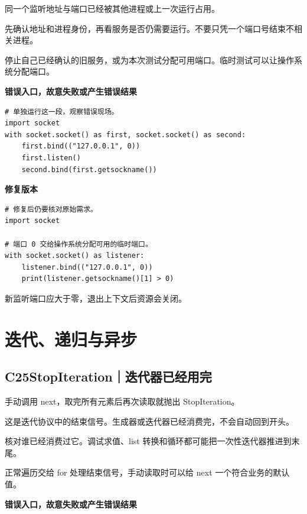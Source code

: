 \documentclass[UTF8,a4paper,oneside,openany,fontset=none,11pt]{ctexbook}
\newcommand{\code}[1]{\texttt{\detokenize{#1}}}
\newcommand{\CaseStep}[2]{\par\smallskip{\bfseries\color{Muted}#1}\enspace #2\par}
\begin{document}
\CaseStep{原因}{同一个监听地址与端口已经被其他进程或上一次运行占用。}

\CaseStep{排查}{先确认地址和进程身份，再看服务是否仍需要运行。不要只凭一个端口号结束不相关进程。}

\CaseStep{修复}{停止自己已经确认的旧服务，或为本次测试分配可用端口。临时测试可以让操作系统分配端口。}

\textbf{错误入口，故意失败或产生错误结果}

\begin{lstlisting}[style=errorcode,title={错误复现（故意失败或错误结果）：\code{case_24_bad.py.txt}}]
# 单独运行这一段，观察错误现场。
import socket
with socket.socket() as first, socket.socket() as second:
    first.bind(("127.0.0.1", 0))
    first.listen()
    second.bind(first.getsockname())
\end{lstlisting}

\textbf{修复版本}

\begin{lstlisting}[title={\code{case_24.py}}]
# 修复后仍要核对原始需求。
import socket

# 端口 0 交给操作系统分配可用的临时端口。
with socket.socket() as listener:
    listener.bind(("127.0.0.1", 0))
    print(listener.getsockname()[1] > 0)
\end{lstlisting}

\CaseStep{复验}{新监听端口应大于零，退出上下文后资源会关闭。}

\section{迭代、递归与异步}

\subsection*{C25\enspace StopIteration｜迭代器已经用完}

\CaseStep{现象}{手动调用 next，取完所有元素后再次读取就抛出 StopIteration。}

\CaseStep{原因}{这是迭代协议中的结束信号。生成器或迭代器已经消费完，不会自动回到开头。}

\CaseStep{排查}{核对谁已经消费过它。调试求值、list 转换和循环都可能把一次性迭代器推进到末尾。}

\CaseStep{修复}{正常遍历交给 for 处理结束信号，手动读取时可以给 next 一个符合业务的默认值。}

\textbf{错误入口，故意失败或产生错误结果}
\end{document}
